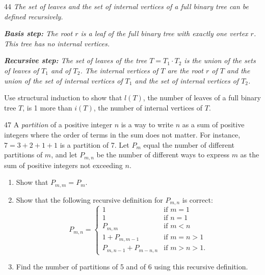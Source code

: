 \documentclass[11pt]{article}
\begin{document}
\begin{exercise}{44}
    \textit{The set of leaves and the set of internal vertices of a
    full binary tree can be defined recursively.}

    \textit{\textbf{Basis step:} The root $r$ is a leaf of the full
    binary tree with exactly one vertex $r$. This tree has no
    internal vertices.}

    \textit{\textbf{Recursive step:} The set of leaves of the tree
    $T = T_1 \cdot T_2$ is the union of the sets of leaves of $T_1$
    and of $T_2$. The internal vertices of $T$ are the root $r$ of
    $T$ and the union of the set of internal vertices of $T_1$ and
    the set of internal vertices of $T_2$.}

    Use structural induction to show that $l(T)$, the number of
    leaves of a full binary tree $T$, is 1 more than $i(T)$, the
    number of internal vertices of $T$.
\end{exercise}

\begin{exercise}{47}
    A \emph{partition} of a positive integer $n$ is a way to write
    $n$ as a sum of positive integers where the order of terms in
    the sum does not matter. For instance, $7 = 3+2+1+1$ is a
    partition of 7. Let $P_m$ equal the number of different
    partitions of $m$, and let $P_{m,n}$ be the number of different
    ways to express $m$ as the sum of positive integers not
    exceeding $n$.
    \begin{enumerate}[label=(\alph*)]
        \item Show that $P_{m,m} = P_m$.
        \item Show that the following recursive definition for
        $P_{m,n}$ is correct:
        \[
        P_{m,n} =
        \begin{cases}
            1 & \text{if } m = 1 \\
            1 & \text{if } n = 1 \\
            P_{m,m} & \text{if } m < n \\
            1 + P_{m,m-1} & \text{if } m = n > 1 \\
            P_{m,n-1} + P_{m-n,n} & \text{if } m > n > 1.
        \end{cases}
        \]
        \item Find the number of partitions of 5 and of 6 using this
        recursive definition.
    \end{enumerate}
\end{exercise}
\end{document}
